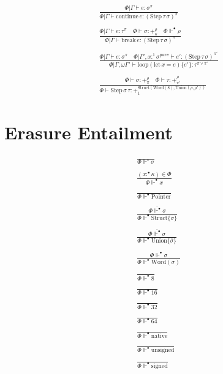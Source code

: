 \documentclass {article}
\begin{document}
\begin{gather*}
\frac
{\Phi | \Gamma \vdash e : \sigma^\pi }
{\Phi | \Gamma \vdash \text{continue} \, e : (\text{Step} \, \tau \, \sigma)^\pi } \\
\\
\frac
{\Phi | \Gamma \vdash e : \tau^\pi \quad \Phi \vdash \sigma : +^\rho_\kappa \quad \Phi \Vdash^\bullet \rho}
{\Phi | \Gamma \vdash \text{break} \, e : (\text{Step} \, \tau \, \sigma)^\pi } \\
\\
\frac
{\Phi | \Gamma \vdash e : \sigma^\pi \quad
\Phi | \Gamma', x :^1 \sigma^\texttt{pure} \vdash e' : (\text{Step} \, \tau \, \sigma)^{\pi'}}
{\Phi | \Gamma, \omega \Gamma' \vdash \text{loop} (\text{let} \, x = e) \{ e' \} : \tau^{\pi \lor \pi'} } \\
\\
\frac
{\Phi \vdash \sigma : +^{\rho}_{\pi} \quad \Phi \vdash \tau : +^{\rho}_{\pi'} }
{\Phi \vdash \text{Step} \, \sigma \, \tau : +^{\text{Struct} (\text{Word} (8), \text{Union} (\rho, \rho') ) }_1 }
\end{gather*}
\section{Erasure Entailment}
\begin{gather*}
\frac
{}
{\Phi \Vdash^\circ \sigma} \\
\\
\frac
{(x :^\bullet \kappa) \in \Phi}
{\Phi \Vdash^\bullet x} \\
\\
\frac
{}
{\Phi \Vdash^\bullet \text{Pointer}} \\
\\
\frac
{\overline{\Phi \Vdash^\bullet \sigma}}
{\Phi \Vdash^\bullet \text{Struct} \{ \overline \sigma \}} \\
\\
\frac
{\overline{\Phi \Vdash^\bullet \sigma}}
{\Phi \Vdash^\bullet \text{Union} \{ \overline \sigma \}} \\
\\
\frac
{\Phi \Vdash^\bullet \sigma}
{\Phi \Vdash^\bullet \text{Word} (\sigma)} \\
\\
\frac
{}
{\Phi \Vdash^\bullet 8} \\
\\
\frac
{}
{\Phi \Vdash^\bullet 16} \\
\\
\frac
{}
{\Phi \Vdash^\bullet 32} \\
\\
\frac
{}
{\Phi \Vdash^\bullet 64} \\
\\
\frac
{}
{\Phi \Vdash^\bullet \text{native}} \\
\\
\frac
{}
{\Phi \Vdash^\bullet \text{unsigned}} \\
\\
\frac
{}
{\Phi \Vdash^\bullet \text{signed}} \\
\end{gather*}
\end{document}
